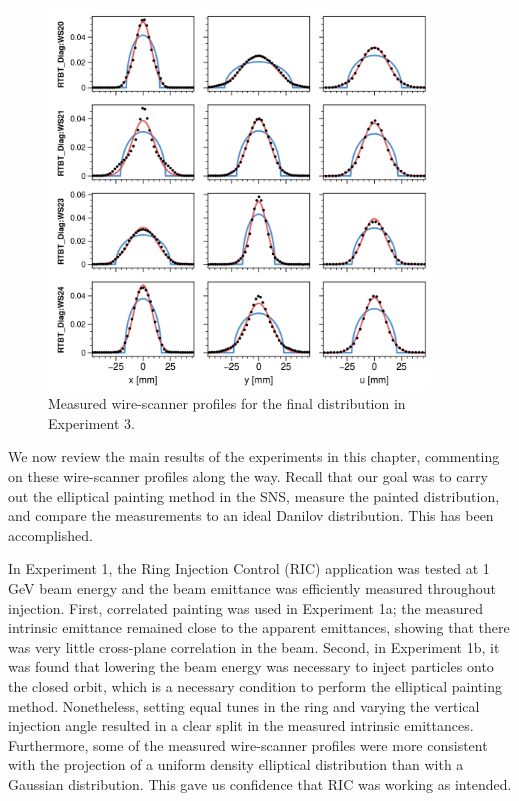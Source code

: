 %
\begin{figure}[!p]
    \centering
    \includegraphics[width=0.9\textwidth]{Images/chapter5/exp3/fits_7.png}
    \caption{Measured wire-scanner profiles for the final distribution in Experiment 3.}
    \label{fig:exp3_fits}
\end{figure}
%

We now review the main results of the experiments in this chapter, commenting on these wire-scanner profiles along the way. Recall that our goal was to carry out the elliptical painting method in the SNS, measure the painted distribution, and compare the measurements to an ideal Danilov distribution. This has been accomplished. 

In Experiment 1, the Ring Injection Control (RIC) application was tested at 1 GeV beam energy and the beam emittance was efficiently measured throughout injection. First, correlated painting was used in Experiment 1a; the measured intrinsic emittance remained close to the apparent emittances, showing that there was very little cross-plane correlation in the beam. Second, in Experiment 1b, it was found that lowering the beam energy was necessary to inject particles onto the closed orbit, which is a necessary condition to perform the elliptical painting method. Nonetheless, setting equal tunes in the ring and varying the vertical injection angle resulted in a clear split in the measured intrinsic emittances. Furthermore, some of the measured wire-scanner profiles were more consistent with the projection of a uniform density elliptical distribution than with a Gaussian distribution. This gave us confidence that RIC was working as intended.

